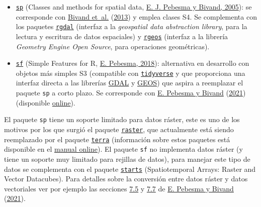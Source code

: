 \documentclass[
  spanish,
]{book}
\theoremstyle{break}
\theoremstyle{definition}
\theoremstyle{definition}
\theoremstyle{definition}
\theoremstyle{definition}
\theoremstyle{remark}
\begin{document}
\begin{itemize}
\item
  \href{https://CRAN.R-project.org/package=sp}{\texttt{sp}} (Classes and methods for spatial data, \protect\hyperlink{ref-Pebesma2005}{E. J. Pebesma y Bivand, 2005}): se corresponde con \protect\hyperlink{ref-Bivand2013}{Bivand et~al.} (\protect\hyperlink{ref-Bivand2013}{2013}) y emplea clases S4. Se complementa con los paquetes \href{https://CRAN.R-project.org/package=rgdal}{\texttt{rgdal}} (interfaz a la \emph{geospatial data abstraction library}, para la lectura y escritura de datos espaciales) y \href{https://CRAN.R-project.org/package=rgeos}{\texttt{rgeos}} (interfaz a la librería \emph{Geometry Engine Open Source}, para operaciones geométricas).
\item
  \href{https://r-spatial.github.io/sf}{\texttt{sf}} (Simple Features for R, \protect\hyperlink{ref-Pebesma2018}{E. Pebesma, 2018}): alternativa en desarrollo con objetos más simples S3 (compatible con \href{http://tidyverse.org}{\texttt{tidyverse}} y que proporciona una interfaz directa a las librerías \href{https://gdal.org}{GDAL} y \href{https://trac.osgeo.org/geos}{GEOS}) que aspira a reemplazar el paquete \texttt{sp} a corto plazo. Se corresponde con \protect\hyperlink{ref-Pebesma2021}{E. Pebesma y Bivand} (\protect\hyperlink{ref-Pebesma2021}{2021}) (disponible \href{https://keen-swartz-3146c4.netlify.app}{online}).
\end{itemize}

El paquete \texttt{sp} tiene un soporte limitado para datos ráster, este es uno de los motivos por los que surgió el paquete \href{https://CRAN.R-project.org/package=raster}{\texttt{raster}}, que actualmente está siendo reemplazado por el paquete \href{https://CRAN.R-project.org/package=terra}{\texttt{terra}} (información sobre estos paquetes está disponible en el \href{https://rspatial.org/}{manual online}).
El paquete \texttt{sf} no implementa datos ráster (y tiene un soporte muy limitado para rejillas de datos), para manejar este tipo de datos se complementa con el paquete \href{https://r-spatial.github.io/stars}{\texttt{starts}} (Spatiotemporal Arrays: Raster and Vector Datacubes).
Para detalles sobre la conversión entre datos ráster y datos vectoriales ver por ejemplo las secciones \href{https://keen-swartz-3146c4.netlify.app/sf.html\#raster-to-vector}{7.5} y \href{https://keen-swartz-3146c4.netlify.app/sf.html\#warp}{7.7} de \protect\hyperlink{ref-Pebesma2021}{E. Pebesma y Bivand} (\protect\hyperlink{ref-Pebesma2021}{2021}).
\end{document}
